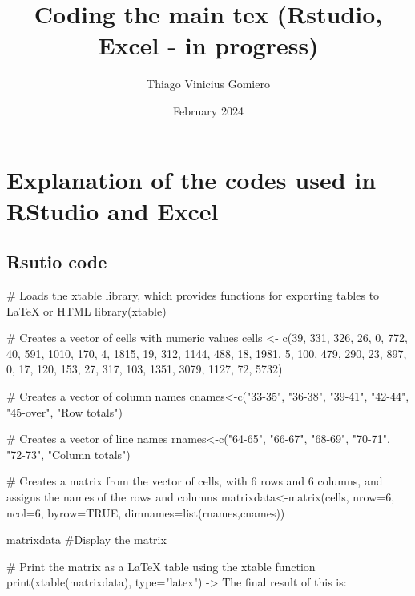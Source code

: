 \documentclass{article}
\title{Coding the main tex (Rstudio, Excel - in progress)} %
\author{Thiago  Vinicius Gomiero} %
\date{February 2024} %
\begin{document}
\maketitle %
\section{Explanation of the codes used in RStudio and Excel}
\subsection{Rsutio code}

\begin{spverbatim}
# Loads the xtable library, which provides functions for exporting tables to LaTeX or HTML
library(xtable)

# Creates a vector of cells with numeric values
cells <- c(39, 331, 326, 26, 0, 772, 40, 591, 1010, 170, 4, 1815, 19, 312, 1144, 488, 18, 1981, 5, 100, 479, 290, 23, 897, 0, 17, 120, 153, 27, 317, 103, 1351, 3079, 1127, 72, 5732)

# Creates a vector of column names
cnames<-c("33-35", "36-38", "39-41", "42-44", "45-over", "Row totals")

# Creates a vector of line names
rnames<-c("64-65", "66-67", "68-69", "70-71", "72-73", "Column totals")

# Creates a matrix from the vector of cells, with 6 rows and 6 columns, and assigns the names of the rows and columns
matrixdata<-matrix(cells, nrow=6, ncol=6, byrow=TRUE, dimnames=list(rnames,cnames))

matrixdata #Display the matrix

# Print the matrix as a LaTeX table using the xtable function
print(xtable(matrixdata), type="latex")
-> The final result of this is:
\end{spverbatim}
\end{document}
